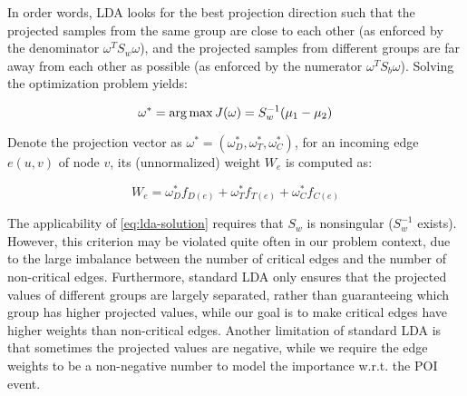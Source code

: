 In order words, LDA looks for the best projection direction such that the projected samples from the same group are close to each other (as enforced by the denominator $\omega^TS_w\omega$), and the projected samples from different groups are far away from each other as possible (as enforced by the numerator $\omega^TS_b\omega$). Solving the optimization problem yields:


\begin{equation}
    \label{eq:lda-solution}
    \omega^* = \operatorname*{arg\,max} J(\omega) = S_w^{-1}(\mu_1-\mu_2)
\end{equation}

Denote the projection vector as $\omega^{*} = (\omega^{*}_{D}, \omega^{*}_{T}, \omega^{*}_{C})$, for an incoming edge $e(u,v)$ of node $v$, its (unnormalized) weight $W_e$ is computed as:

\begin{equation}
    \label{eq:projection}
    W_e = \omega^{*}_{D} f_{D(e)} + \omega^{*}_{T} f_{T(e)} + \omega^{*}_{C} f_{C(e)}
\end{equation}

The applicability of \cref{eq:lda-solution} 
requires that $S_w$ is nonsingular (\ie $S_w^{-1}$ exists).
However, this criterion may be violated quite often in our problem context, due to the large imbalance between the number of critical edges and the number of non-critical edges.
Furthermore, standard LDA only ensures that the projected values of different groups are largely separated, rather than guaranteeing which group has higher projected values, while our goal is to make critical edges have higher weights than non-critical edges.
Another limitation of standard LDA is that sometimes the projected values are negative, while we require the edge weights to be a non-negative number to model the importance w.r.t. the POI event.



